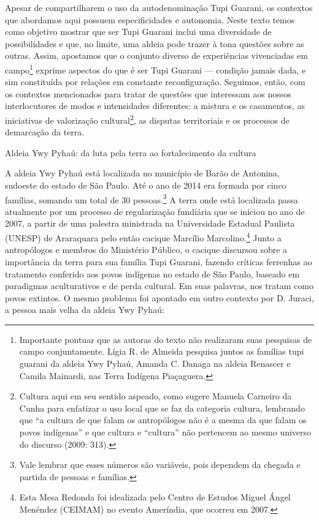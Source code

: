 \documentclass{article}
\begin{document}
Apesar de compartilharem o uso da autodenomina\c{c}\~ao Tupi Guarani, os
contextos que abordamos aqui possuem especificidades e autonomia. Neste
texto temos como objetivo mostrar que ser Tupi Guarani inclui uma
diversidade de possibilidades e que, no limite, uma aldeia pode trazer
\`a tona quest\~oes sobre as outras. Assim, apostamos que o conjunto
diverso de experi\^encias vivenciadas em campo\footnote{ Importante
pontuar que as autoras do texto n\~ao realizaram suas pesquisas de
campo conjuntamente. L\'igia R. de Almeida pesquisa juntos as
fam\'ilias tupi guarani da aldeia Ywy Pyha\'u, Amanda C. Danaga na
aldeia Renascer e Camila Mainardi, nas Terra Ind\'igena
Pia\c{c}aguera.} exprime aspectos do que \'e ser Tupi Guarani ---
condi\c{c}\~ao jamais dada, e sim constitu\'ida por rela\c{c}\~oes em
constante reconfigura\c{c}\~ao. Seguimos, ent\~ao, com os contextos
mencionados para tratar de quest\~oes que interessam aos nossos
interlocutores de modos e intensidades diferentes: a mistura e os
casamentos, as iniciativas de valoriza\c{c}\~ao cultural\footnote{
Cultura aqui em seu sentido aspeado, como sugere Manuela Carneiro da
Cunha para enfatizar o uso local que se faz da categoria cultura,
lembrando que {\textquotedblleft}a cultura de que falam os
antrop\'ologos n\~ao \'e a mesma da que falam os povos
ind\'igenas{\textquotedblright} e que cultura e
{\textquotedblleft}cultura{\textquotedblright} n\~ao pertencem ao mesmo
universo do discurso (2009: 313).}, as disputas territoriais e os
processos de demarca\c{c}\~ao da terra.  

Aldeia Ywy Pyha\'u: da luta pela terra ao fortalecimento da cultura

A aldeia Ywy Pyha\'u est\'a localizada no munic\'ipio de Bar\~ao de
Antonina, sudoeste do estado de S\~ao Paulo. At\'e o ano de 2014 era
formada por cinco fam\'ilias, somando um total de 30 pessoas.\footnote{
Vale lembrar que esses n\'umeros s\~ao vari\'aveis, pois dependem da
chegada e partida de pessoas e fam\'ilias.} A terra onde est\'a
localizada passa atualmente por um processo de regulariza\c{c}\~ao
fundi\'aria que se iniciou no ano de 2007, a partir de uma palestra
ministrada na Universidade Estadual Paulista (UNESP) de Araraquara pelo
ent\~ao cacique Marc\'ilio Marcolino.\footnote{ Esta Mesa Redonda foi
idealizada pelo Centro de Estudos Miguel \'Angel Men\'endez (CEIMAM) no
evento Amer\'india, que ocorreu em 2007.} Junto a antrop\'ologos e
membros do Minist\'erio P\'ublico, o cacique discursou sobre a
import\^ancia da terra para sua fam\'ilia Tupi Guarani, fazendo
cr\'iticas ferrenhas ao tratamento conferido aos povos ind\'igenas no
estado de S\~ao Paulo, baseado em paradigmas aculturativos e de perda
cultural. Em suas palavras, nos tratam como povos extintos. O mesmo
problema foi apontado em outro contexto por D. Juraci, a pessoa mais
velha da aldeia Ywy Pyha\'u:
\end{document}

